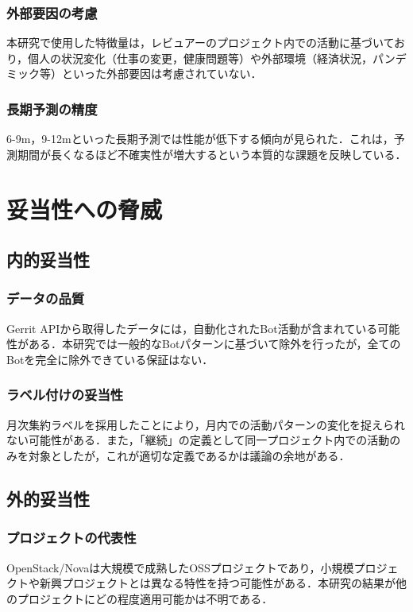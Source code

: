 \subsubsection{外部要因の考慮}
本研究で使用した特徴量は，レビュアーのプロジェクト内での活動に基づいており，個人の状況変化（仕事の変更，健康問題等）や外部環境（経済状況，パンデミック等）といった外部要因は考慮されていない．

\subsubsection{長期予測の精度}
6-9m，9-12mといった長期予測では性能が低下する傾向が見られた．これは，予測期間が長くなるほど不確実性が増大するという本質的な課題を反映している．

\section{妥当性への脅威}
\label{sec:threats}

\subsection{内的妥当性}

\subsubsection{データの品質}
Gerrit APIから取得したデータには，自動化されたBot活動が含まれている可能性がある．本研究では一般的なBotパターンに基づいて除外を行ったが，全てのBotを完全に除外できている保証はない．

\subsubsection{ラベル付けの妥当性}
月次集約ラベルを採用したことにより，月内での活動パターンの変化を捉えられない可能性がある．また，「継続」の定義として同一プロジェクト内での活動のみを対象としたが，これが適切な定義であるかは議論の余地がある．

\subsection{外的妥当性}

\subsubsection{プロジェクトの代表性}
OpenStack/Novaは大規模で成熟したOSSプロジェクトであり，小規模プロジェクトや新興プロジェクトとは異なる特性を持つ可能性がある．本研究の結果が他のプロジェクトにどの程度適用可能かは不明である．

